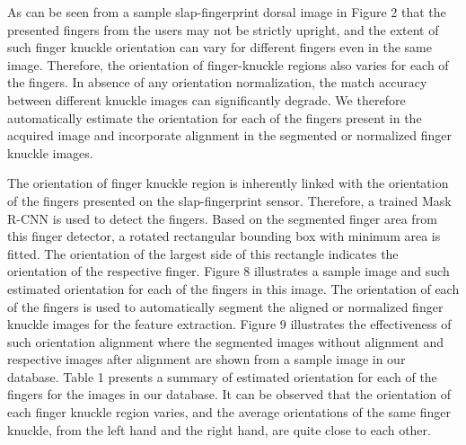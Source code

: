 As can be seen from a sample slap-fingerprint dorsal image in Figure 2 that the presented fingers from the users may not be strictly upright, and the extent of such finger knuckle orientation can vary for different fingers even in the same image. Therefore, the orientation of finger-knuckle regions also varies for each of the fingers. In absence of any orientation normalization, the match accuracy between different knuckle images can significantly degrade. We therefore automatically estimate the orientation for each of the fingers present in the acquired image and incorporate alignment in the segmented or normalized finger knuckle images.

The orientation of finger knuckle region is inherently linked with the orientation of the fingers presented on the slap-fingerprint sensor. Therefore, a trained Mask R-CNN is used to detect the fingers. Based on the segmented finger area from this finger detector, a rotated rectangular bounding box with minimum area is fitted. The orientation of the largest side of this rectangle indicates the orientation of the respective finger. Figure 8 illustrates a sample image and such estimated orientation for each of the fingers in this image. The orientation of each of the fingers is used to automatically segment the aligned or normalized finger knuckle images for the feature extraction. Figure 9 illustrates the effectiveness of   such   orientation   alignment   where   the   segmented images without alignment and respective images after alignment are shown from a sample image in our database. Table 1 presents a summary of estimated orientation for each of the fingers for the images in our database. It can be observed that the orientation of each finger knuckle region varies, and the average orientations of the same finger knuckle, from the left hand and the right hand, are quite close to each other.

